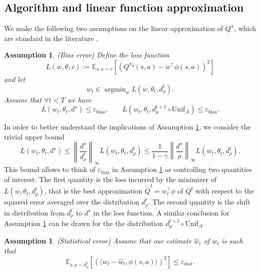 \documentclass[a4paper,12pt]{article}
\newtheorem{assumption}[theorem]{Assumption}
\numberwithin{theorem}{section}
\newcommand\E{\mathbb{E}}
\newcommand\A{\mathcal{A}}
\newcommand\1{\mathbf{1}}
\newcommand{\argmin}{\mathop{\mathrm{argmin}}}
\newcommand{\norm}[1]{\left\lVert #1 \right\rVert}
\begin{document}
\subsection{Algorithm and linear function approximation}
\label{sub:lin}
We make the following two assumptions on the linear approximation of $Q^\pi$, which are standard in the literature \citep{RN265,RN280}.
\begin{assumption} (Bias error)
	\label{ass:bias}
	Define the loss function
	\[L(w,\theta,v) := \E_{s, a\sim v}\left[\left(Q^{\pi_\theta} (s,a)-  w^\top \phi(s,a)\right)^2\right]\]
	and let
	\begin{equation}
		\label{eq:min}
		w_t\in\argmin_w L(w,\theta_t,d^t_\rho).
	\end{equation}
	Assume that $\forall t < T$ we have
	\[L(w_t,\theta_t,d^\star)\leq\varepsilon_\text{bias},\qquad L(w_t,\theta_t,d^{t+1}_\mu\circ\text{Unif}_\A)\leq\varepsilon_\text{bias}.\]
\end{assumption}
In order to better understand the implications of Assumption \ref{ass:bias}, we consider the trivial upper bound \citep{RN265}
\[L(w_t,\theta_t,d^\star)\leq \norm{\frac{d^\star}{d^t_\rho}}_\infty\!\!\!\!\! L(w_t,\theta_t,d^t_\rho)\leq \frac{1}{1-\gamma}\norm{\frac{d^\star}{\rho}}_\infty\!\!\!\!\! L(w_t,\theta_t,d^t_\rho).\]
This bound allows to think of $\varepsilon_\text{bias}$ in Assumption \ref{ass:bias} as controlling two quantities of interest. The first quantity is the loss incurred by the minimizer of $L(w,\theta_t,d^t_\rho)$, that is the best approximation $\widetilde{Q}^t =  w_t^\top \phi$ of $Q^t$ with respect to the squared error averaged over the distribution $d^t_\rho$. The second quantity is the shift in distribution from $d^t_\rho$ to $d^\star$ in the loss function. A similar conclusion for Assumption \ref{ass:bias} can be drawn for the the distribution $d^{t+1}_\mu\circ\text{Unif}_\A$. 



\begin{assumption} (Statistical error)
	Assume that our estimate $\widehat{w}_t$ of $w_t$ is such that
	\label{ass:stat}
	\[\E_{s,a\sim d^t_\rho}\left[\left(\langle w_t-\widehat{w}_t, \phi(s,a)\rangle\right)^2\right]\leq\varepsilon_\text{stat}.\]
\end{assumption}
\end{document}
